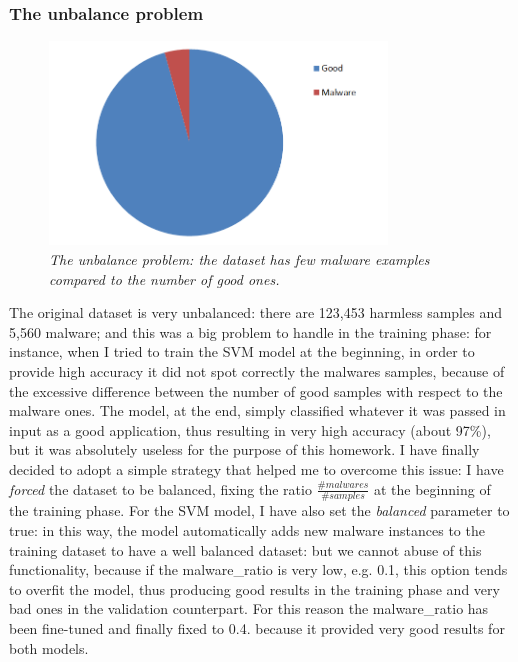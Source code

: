 \documentclass[12pt]{article}
\begin{document}
\subsubsection{The unbalance problem}
\label{sec:unbalance}
\begin{figure}[!ht]
	\centering %
	\includegraphics[width=0.8\textwidth]{unbalance.png} %
	\caption{\textit{The unbalance problem: the dataset has few malware examples compared to the number of good ones.}} 
	\label{fig:unbalance}
\end{figure}
The original dataset is very unbalanced: there are 123,453 harmless samples and 5,560 malware; and this was a big problem to handle in the training phase: for instance, when I tried to train the SVM model at the beginning, in order to provide high accuracy it did not spot correctly the malwares samples, because of the excessive difference between the number of good samples with respect to the malware ones. The model, at the end, simply classified whatever it was passed in input as a good application, thus resulting in very high accuracy (about 97\%), but it was absolutely useless for the purpose of this homework. I have finally decided to adopt a simple strategy that helped me to overcome this issue: I have \textit{forced} the dataset to be balanced, fixing the ratio $ \frac{\# malwares}{\# samples}$ at the beginning of the training phase. For the SVM model, I have also set the \textit{balanced} parameter to true: in this way, the model automatically adds new malware instances to the training dataset to have a well balanced dataset: but we cannot abuse of this functionality, because if the malware\_ratio is very low, e.g. 0.1, this option tends to overfit the model, thus producing good results in the training phase and very bad ones in the validation counterpart. For this reason the malware\_ratio has been fine-tuned and finally fixed to 0.4. because it provided very good results for both models.
\end{document}
